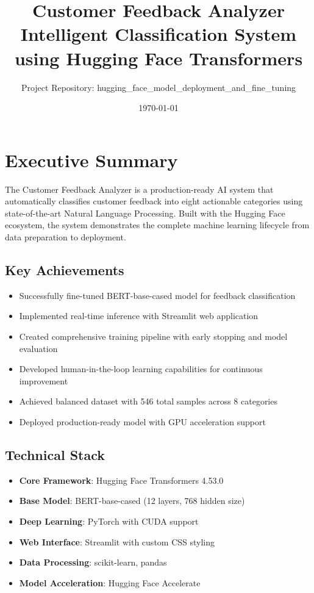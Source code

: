 \documentclass[11pt,a4paper]{article}
\title{Customer Feedback Analyzer\\\large Intelligent Classification System using Hugging Face Transformers}
\author{Project Repository: hugging\_face\_model\_deployment\_and\_fine\_tuning}
\date{\today}
\begin{document}
\maketitle
\tableofcontents
\newpage

\section{Executive Summary}

The Customer Feedback Analyzer is a production-ready AI system that automatically classifies customer feedback into eight actionable categories using state-of-the-art Natural Language Processing. Built with the Hugging Face ecosystem, the system demonstrates the complete machine learning lifecycle from data preparation to deployment.

\subsection{Key Achievements}
\begin{itemize}
  \item Successfully fine-tuned BERT-base-cased model for feedback classification
  \item Implemented real-time inference with Streamlit web application
  \item Created comprehensive training pipeline with early stopping and model evaluation
  \item Developed human-in-the-loop learning capabilities for continuous improvement
  \item Achieved balanced dataset with 546 total samples across 8 categories
  \item Deployed production-ready model with GPU acceleration support
\end{itemize}

\subsection{Technical Stack}
\begin{itemize}
  \item \textbf{Core Framework}: Hugging Face Transformers 4.53.0
  \item \textbf{Base Model}: BERT-base-cased (12 layers, 768 hidden size)
  \item \textbf{Deep Learning}: PyTorch with CUDA support
  \item \textbf{Web Interface}: Streamlit with custom CSS styling
  \item \textbf{Data Processing}: scikit-learn, pandas
  \item \textbf{Model Acceleration}: Hugging Face Accelerate
\end{itemize}
\end{document}
